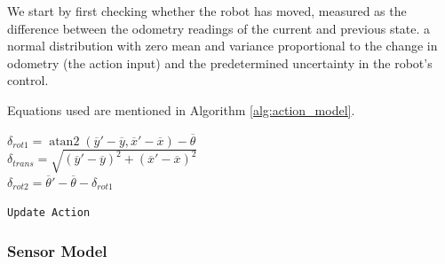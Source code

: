 \documentclass[journal]{IEEEtran}
\DeclareMathOperator{\atantwo}{atan2}
\begin{document}
            We start by first checking whether the robot has moved, measured as the difference between the odometry readings of the current and previous state. 
            a normal distribution with zero mean and variance proportional to the change in odometry (the action input) and the predetermined uncertainty in the robot's control. 
      
            Equations used are mentioned in Algorithm \ref{alg:action_model}.
            
            \begin{algorithm}[]
            \label{alg:action_model}
            \SetAlgoLined
             
             
             $\delta_{rot1} = \atantwo(\overline{y}'-\overline{y}, \overline{x}'-\overline{x}) - \overline{\theta}$    \\ 
             $\delta_{trans} = \sqrt{(\overline{y}'-\overline{y})^{2} + (\overline{x}'-\overline{x})^{2}}$    \\
             $\delta_{rot2} = \overline{\theta}' - \overline{\theta} - \delta_{rot1}$ \\
             
            \caption{\texttt{Update Action}}
            \end{algorithm}
                        
            
            
            
        
         \subsubsection{Sensor Model}
         
\end{document}
